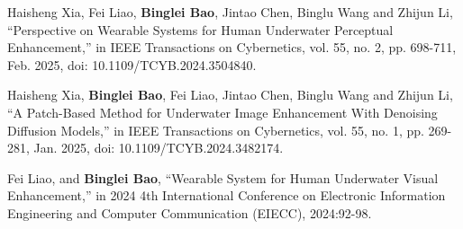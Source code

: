 
\begin{achievements}

\begin{theachievements}[已发表论文]
  \item Haisheng Xia, Fei Liao, \textbf{Binglei Bao}, Jintao Chen, Binglu Wang and Zhijun Li, “Perspective on Wearable Systems for Human Underwater Perceptual Enhancement,” in IEEE Transactions on Cybernetics, vol. 55, no. 2, pp. 698-711, Feb. 2025, doi: 10.1109/TCYB.2024.3504840.
  \item Haisheng Xia, \textbf{Binglei Bao}, Fei Liao, Jintao Chen, Binglu Wang and Zhijun Li, “A Patch-Based Method for Underwater Image Enhancement With Denoising Diffusion Models,” in IEEE Transactions on Cybernetics, vol. 55, no. 1, pp. 269-281, Jan. 2025, doi: 10.1109/TCYB.2024.3482174.
  \item Fei Liao, and \textbf{Binglei Bao}, “Wearable System for Human Underwater Visual Enhancement,” in 2024 4th International Conference on Electronic Information Engineering and Computer Communication (EIECC), 2024:92-98.
\end{theachievements}






\end{achievements}
